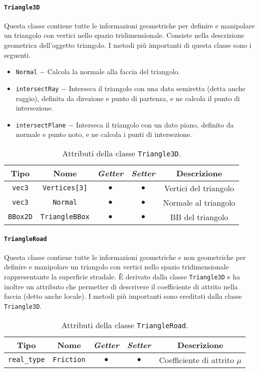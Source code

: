\paragraph{\texttt{Triangle3D}}
Questa classe contiene tutte le informazioni geometriche per definire e manipolare un triangolo con vertici nello spazio tridimensionale. Consiste nella descrizione geometrica dell'oggetto triangolo. I metodi più importanti di questa classe sono i seguenti.
\begin{itemize}
	\item \texttt{Normal} $-$ Calcola la normale alla faccia del triangolo.
	\item \texttt{intersectRay} $-$ Interseca il triangolo con una data semiretta (detta anche raggio), definita da direzione e punto di partenza, e ne calcola il punto di intersezione.
	\item \texttt{intersectPlane} $-$ Interseca il triangolo con un dato piano, definito da normale e punto noto, e ne calcola i punti di intersezione.
\end{itemize}
\begin{table}[h!]
	\centering
	\begin{tabular}{|c|c|c|c|c|}
		\hline 
		\textbf{Tipo} & \textbf{Nome} & \textit{\textbf{Getter}} & \textit{\textbf{Setter}} & \textbf{Descrizione} \\ \hline 
		\texttt{vec3} & \texttt{Vertices[3]} & $\bullet$ & $\bullet$ & Vertici del triangolo \\ \hline 
		\texttt{vec3} & \texttt{Normal} & $\bullet$ & $\bullet$ & Normale al triangolo \\ \hline 
		\texttt{BBox2D} & \texttt{TriangleBBox} & $\bullet$ & $\bullet$ & \ac{BB} del triangolo \\ \hline
	\end{tabular}
	\caption{Attributi della classe \texttt{Triangle3D}.}
\end{table}
%
\paragraph{\texttt{TriangleRoad}}
Questa classe contiene tutte le informazioni geometriche e non geometriche per definire e manipolare un triangolo con vertici nello spazio tridimensionale rappresentante la superficie stradale. È derivato dalla classe \texttt{Triangle3D} e ha inoltre un attributo che permetter di descrivere il coefficiente di attrito nella faccia (detto anche locale). I metodi più importanti sono ereditati dalla classe \texttt{Triangle3D}.
\begin{table}[h!]
	\centering
	\begin{tabular}{|c|c|c|c|c|}
		\hline 
		\textbf{Tipo} & \textbf{Nome} & \textit{\textbf{Getter}} & \textit{\textbf{Setter}} & \textbf{Descrizione} \\ \hline 
		\texttt{real\_type} & \texttt{Friction} & $\bullet$ & $\bullet$ & Coefficiente di attrito $\mu$ \\ \hline
	\end{tabular}
	\caption{Attributi della classe \texttt{TriangleRoad}.}
\end{table}
%
